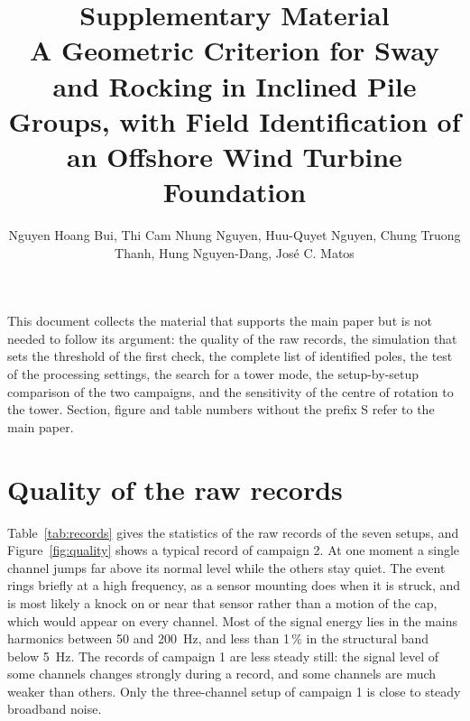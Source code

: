 \documentclass[11pt]{article}
\title{Supplementary Material\\[4pt]
\large A Geometric Criterion for Sway and Rocking in Inclined Pile Groups, with Field Identification of an Offshore Wind Turbine Foundation}
\author{Nguyen Hoang Bui, Thi Cam Nhung Nguyen, Huu-Quyet Nguyen, Chung Truong Thanh, Hung Nguyen-Dang, Jos\'e C. Matos}
\date{}
\begin{document}
\maketitle

\noindent This document collects the material that supports the main paper but
is not needed to follow its argument: the quality of the raw records, the
simulation that sets the threshold of the first check, the complete list of
identified poles, the test of the processing settings, the search for a tower
mode, the setup-by-setup comparison of the two campaigns, and the sensitivity
of the centre of rotation to the tower. Section, figure and
table numbers without the prefix S refer to the main paper.

\section{Quality of the raw records}
\label{sec:s-quality}

Table~\ref{tab:records} gives the statistics of the raw records of the seven
setups, and Figure~\ref{fig:quality} shows a typical record of campaign 2. At
one moment a single channel jumps far above its normal level while the others
stay quiet. The event rings briefly at a high frequency, as a sensor mounting
does when it is struck, and is most likely a knock on or near that sensor
rather than a motion of the cap, which would appear on every channel. Most of
the signal energy lies in the mains harmonics between 50 and 200~Hz, and less
than 1\,\% in the structural band below 5~Hz. The records of campaign 1 are
less steady still: the signal level of some channels changes strongly during a
record, and some channels are much weaker than others. Only the three-channel
setup of campaign 1 is close to steady broadband noise.
\end{document}
